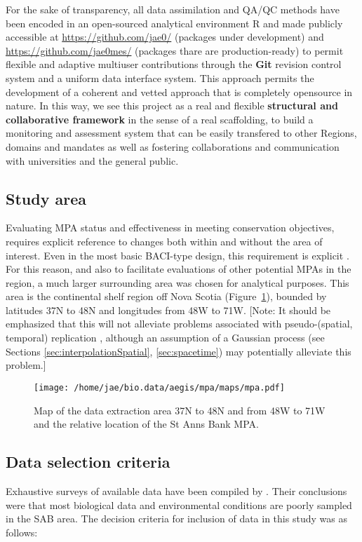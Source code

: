 \documentclass[letterpaper,portrait,11pt]{scrartcl}
\numberwithin{equation}{section}    %
\numberwithin{figure}{section}    %
\numberwithin{table}{section}       %
\begin{document}
For the sake of transparency, all data assimilation and QA/QC methods have been encoded in an open-sourced analytical environment R \parencite{rCran} and made publicly accessible at \url{https://github.com/jae0/} (packages under development) and \url{https://github.com/jae0mes/} (packages thare are production-ready) to permit flexible and adaptive multiuser contributions through the \textbf{Git} revision control system and a uniform data interface system. This approach permits the development of a coherent and vetted approach that is completely opensource in nature. In this way, we see this project as a real and flexible \textbf{structural and collaborative framework} in the sense of a real scaffolding, to build a monitoring and assessment system that can be easily transfered to other Regions, domains and mandates as well as fostering collaborations and communication with universities and the general public.

\subsection{Study area}
Evaluating MPA status and effectiveness in meeting conservation objectives, requires explicit reference to changes both within and without the area of interest. Even in the most basic BACI-type design, this requirement is explicit \parencite{green:1979, underwood1992}. For this reason, and also to facilitate evaluations of other potential MPAs in the region, a much larger surrounding area was chosen for analytical purposes. This area is the continental shelf region off Nova Scotia (Figure~\ref{fig:SAB}), bounded by latitudes 37N to 48N and longitudes from 48W to 71W. [Note: It should be emphasized that this will not alleviate problems associated with pseudo-(spatial, temporal) replication \parencite{hurlbert1984pseudoreplication}, although an assumption of a Gaussian process (see Sections \ref{sec:interpolationSpatial}, \ref{sec:spacetime}) may potentially alleviate this problem.]

\begin{figure}[h]
  \centering
  \texttt{[image: /home/jae/bio.data/aegis/mpa/maps/mpa.pdf]}
  \caption{Map of the data extraction area 37N to 48N and from 48W to 71W and the relative location of the St Anns Bank MPA.}
  \label{fig:SAB}
\end{figure}


\subsection{Data selection criteria}
Exhaustive surveys of available data have been compiled by \textcite{Ford:2013:sab}. Their conclusions were that most biological data and environmental conditions are poorly sampled in the SAB area. The decision criteria for inclusion of data in this study was as follows:
\end{document}
